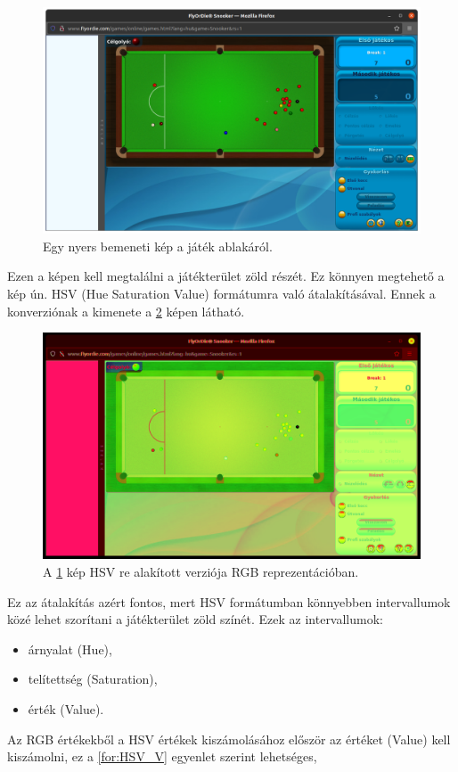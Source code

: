 \begin{figure}[!ht]
    \centering
    \includegraphics[width=150mm, keepaspectratio]{figures/input_screen.png}
    \caption{Egy nyers bemeneti kép a játék ablakáról.}
    \label{fig:bemeneti_kep}
\end{figure}

\par Ezen a képen kell megtalálni a játékterület zöld részét. Ez könnyen megtehető a kép ún. HSV (Hue Saturation Value) formátumra való átalakításával. Ennek a konverziónak a kimenete a \ref{fig:bemeneti_kep_hsv} képen látható.

\begin{figure}[!ht]
    \centering
    \includegraphics[width=150mm, keepaspectratio]{figures/input_screen_hsv.png}
    \caption{A \ref{fig:bemeneti_kep} kép HSV re alakított verziója RGB reprezentációban.}
    \label{fig:bemeneti_kep_hsv}
\end{figure}

\par Ez az átalakítás azért fontos, mert HSV formátumban könnyebben intervallumok közé lehet szorítani a játékterület zöld színét.
\newline Ezek az intervallumok:
\begin{itemize}
    \setlength\itemsep{-2pt}
    \item árnyalat (Hue),
    \item telítettség (Saturation),
    \item érték (Value).
\end{itemize}
\par Az RGB értékekből a HSV értékek kiszámolásához először az értéket (Value) kell kiszámolni, ez a \ref{for:HSV_V} egyenlet szerint lehetséges,

